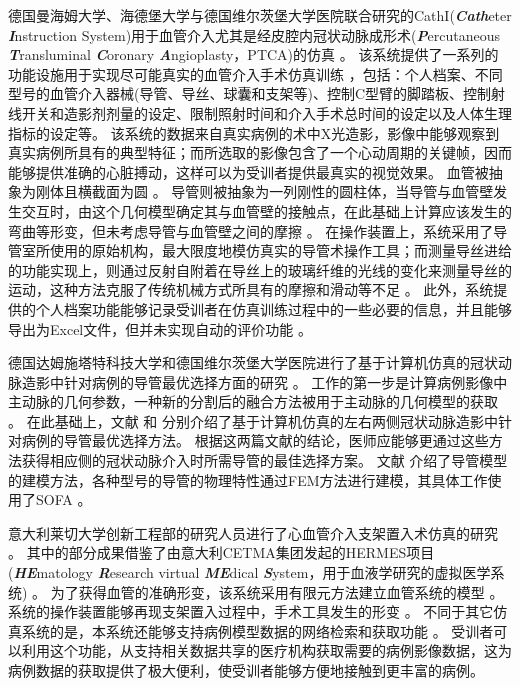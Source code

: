 德国曼海姆大学、海德堡大学与德国维尔茨堡大学医院联合研究的CathI(\textbf{\textit{Cath}}eter \textbf{\textit{I}}nstruction System)用于血管介入尤其是经皮腔内冠状动脉成形术(\textbf{\textit{P}}ercutaneous \textbf{\textit{T}}ransluminal \textbf{\textit{C}}oronary \textbf{\textit{A}}ngioplasty，PTCA)的仿真 \cite{rebholz2004cathi,Hoefer2002CathI}。%
该系统提供了一系列的功能设施用于实现尽可能真实的血管介入手术仿真训练 \cite{rebholz2004cathi}，包括：个人档案、不同型号的血管介入器械(导管、导丝、球囊和支架等)、控制C型臂的脚踏板、控制射线开关和造影剂剂量的设定、限制照射时间和介入手术总时间的设定以及人体生理指标的设定等。%
该系统的数据来自真实病例的术中X光造影，影像中能够观察到真实病例所具有的典型特征；而所选取的影像包含了一个心动周期的关键帧，因而能够提供准确的心脏搏动，这样可以为受训者提供最真实的视觉效果。
血管被抽象为刚体且横截面为圆 \cite{Hoefer2002CathI}。%
导管则被抽象为一列刚性的圆柱体，当导管与血管壁发生交互时，由这个几何模型确定其与血管壁的接触点，在此基础上计算应该发生的弯曲等形变，但未考虑导管与血管壁之间的摩擦 \cite{rebholz2004cathi}。%
在操作装置上，系统采用了导管室所使用的原始机构，最大限度地模仿真实的导管术操作工具；而测量导丝进给的功能实现上，则通过反射自附着在导丝上的玻璃纤维的光线的变化来测量导丝的运动，这种方法克服了传统机械方式所具有的摩擦和滑动等不足 \cite{Hoefer2002CathI}。%
此外，系统提供的个人档案功能能够记录受训者在仿真训练过程中的一些必要的信息，并且能够导出为Excel文件，但并未实现自动的评价功能 \cite{rebholz2004cathi}。

德国达姆施塔特科技大学和德国维尔茨堡大学医院进行了基于计算机仿真的冠状动脉造影中针对病例的导管最优选择方面的研究 \cite{Rahman2012Darmstadt,Rahman2011bDarmstadt,Rahman2011aDarmstadt,Flehmann2011Darmstadt}。%
工作的第一步是计算病例影像中主动脉的几何参数，一种新的分割后的融合方法被用于主动脉的几何模型的获取 \cite{Flehmann2011Darmstadt}。
在此基础上，文献 \cite{Rahman2011bDarmstadt}和 \cite{Rahman2011aDarmstadt}分别介绍了基于计算机仿真的左右两侧冠状动脉造影中针对病例的导管最优选择方法。
根据这两篇文献的结论，医师应能够更通过这些方法获得相应侧的冠状动脉介入时所需导管的最佳选择方案。
文献 \cite{Rahman2012Darmstadt}介绍了导管模型的建模方法，各种型号的导管的物理特性通过FEM方法进行建模，其具体工作使用了SOFA \cite{Allard2007SOFA}。

意大利莱切大学创新工程部的研究人员进行了心血管介入支架置入术仿真的研究 \cite{aloisio2006HERMES,aloisio2006aHERMES,aloisio2005HERMES,aloisio2004HERMES}。
其中的部分成果借鉴了由意大利CETMA集团发起的HERMES项目(\textbf{\textit{HE}}matology \textbf{\textit{R}}esearch virtual \textbf{\textit{ME}}dical \textbf{\textit{S}}ystem，用于血液学研究的虚拟医学系统) \cite{aloisio2005HERMES}。%
为了获得血管的准确形变，该系统采用有限元方法建立血管系统的模型 \cite{aloisio2004HERMES}。
系统的操作装置能够再现支架置入过程中，手术工具发生的形变 \cite{aloisio2005HERMES}。
不同于其它仿真系统的是，本系统还能够支持病例模型数据的网络检索和获取功能 \cite{aloisio2006aHERMES,aloisio2006HERMES}。
受训者可以利用这个功能，从支持相关数据共享的医疗机构获取需要的病例影像数据，这为病例数据的获取提供了极大便利，使受训者能够方便地接触到更丰富的病例。

